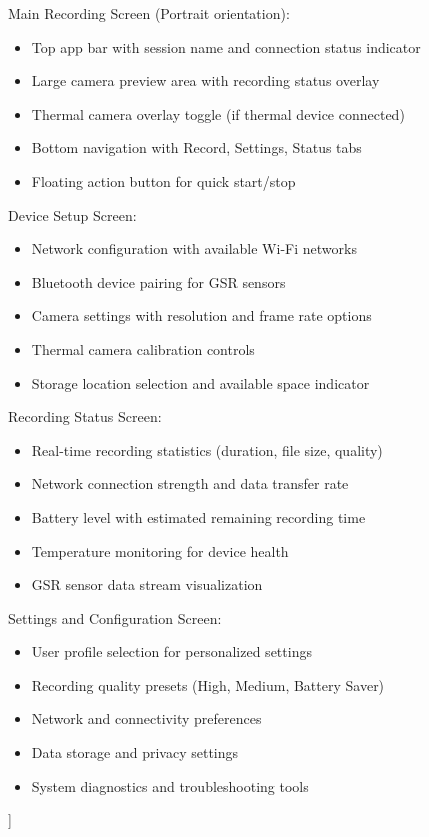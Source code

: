 \documentclass[11pt,a4paper]{report}
\begin{document}
Main Recording Screen (Portrait orientation):
\begin{itemize}
\item Top app bar with session name and connection status indicator
\item Large camera preview area with recording status overlay
\item Thermal camera overlay toggle (if thermal device connected)
\item Bottom navigation with Record, Settings, Status tabs
\item Floating action button for quick start/stop

\end{itemize}
Device Setup Screen:
\begin{itemize}
\item Network configuration with available Wi-Fi networks
\item Bluetooth device pairing for GSR sensors
\item Camera settings with resolution and frame rate options
\item Thermal camera calibration controls
\item Storage location selection and available space indicator

\end{itemize}
Recording Status Screen:
\begin{itemize}
\item Real-time recording statistics (duration, file size, quality)
\item Network connection strength and data transfer rate
\item Battery level with estimated remaining recording time
\item Temperature monitoring for device health
\item GSR sensor data stream visualization

\end{itemize}
Settings and Configuration Screen:
\begin{itemize}
\item User profile selection for personalized settings
\item Recording quality presets (High, Medium, Battery Saver)
\item Network and connectivity preferences
\item Data storage and privacy settings
\item System diagnostics and troubleshooting tools
\end{itemize}
]
\end{document}
